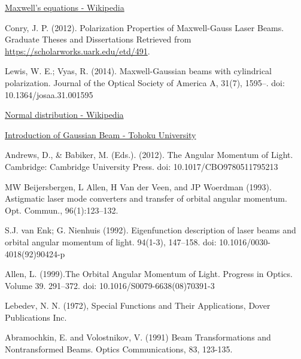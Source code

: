 \documentclass[11pt,a4paper]{article}
\numberwithin{equation}{section}
\begin{document}
\begin{thebibliography}{999}
	\href{https://en.wikipedia.org/wiki/Maxwell's_equations}{Maxwell's equations - Wikipedia}
	
	
	Conry, J. P. (2012). Polarization Properties of Maxwell-Gauss Laser Beams. Graduate Theses and Dissertations Retrieved from \href{https://scholarworks.uark.edu/etd/491}{https://scholarworks.uark.edu/etd/491}.
	
	 Lewis, W. E.; Vyas, R. (2014). Maxwell-Gaussian beams with cylindrical polarization. Journal of the Optical Society of America A, 31(7), 1595–. doi: 10.1364/josaa.31.001595 
	
	\href{https://en.wikipedia.org/wiki/Normal_distribution}{Normal distribution - Wikipedia}
	
	\href{https://flex.phys.tohoku.ac.jp/~rsaito/saito20-GaussianBeam.pdf}{Introduction of Gaussian Beam - Tohoku University}
	
	Andrews, D., \& Babiker, M. (Eds.). (2012). The Angular Momentum of Light. Cambridge: Cambridge University Press. doi: 10.1017/CBO9780511795213
	
	
	MW Beijersbergen, L Allen, H Van der Veen, and JP Woerdman (1993). Astigmatic laser mode converters and transfer of orbital angular momentum. Opt. Commun., 96(1):123–132.
	
	 S.J. van Enk; G. Nienhuis (1992). Eigenfunction description of laser beams and orbital angular momentum of light. 94(1-3), 147–158. doi: 10.1016/0030-4018(92)90424-p     
	 
	 Allen, L. (1999).The Orbital Angular Momentum of Light. Progress in Optics.  Volume 39. 291–372. doi: 10.1016/S0079-6638(08)70391-3
	 
	 
	 Lebedev, N. N. (1972), Special Functions and Their Applications, Dover Publications Inc.
	 
	 Abramochkin, E. and Volostnikov, V. (1991) Beam Transformations and Nontransformed Beams. Optics Communications, 83, 123-135. 
	 

\end{thebibliography}
\end{document}
